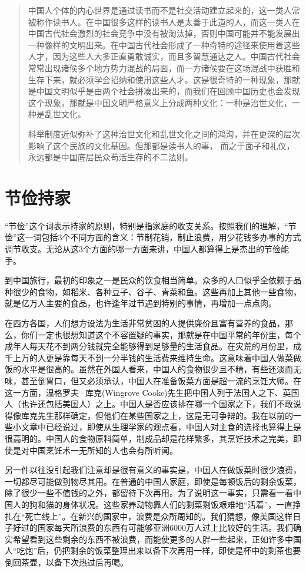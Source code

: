 \documentclass[12pt,oneside]{book}
\begin{document}
\begin{common-format}
\begin{quotation}
中国人个体的内心世界是通过读书而不是社交活动建立起来的，这一类人常被称作读书人。在中国很多这样的读书人是太善于此道的人，而这一类人在中国古代社会激烈的社会竞争中没有被淘汰掉，否则中国可能并不能发展出一种像样的文明出来。在中国古代社会形成了一种奇特的途径来使用着这些人才，因为这些人大多正直勇敢诚实，而且多智慧通达之人。中国古代社会常常出现诸侯多个地方势力混战的局面，而一方诸侯要在这场混战中获胜和生存下来，就必须学会招纳和使用这些人才。这是很奇特的一种现象，那就是中国文明似乎是由两个社会拼凑出来的，而我们在回顾中国历史也会发现这个现象，那就是中国文明严格意义上分成两种文化：一种是治世文化，一种是乱世文化。

科举制度近似弥补了这种治世文化和乱世文化之间的鸿沟，并在更深的层次影响了这个民族的文化基因。但那都是读书人的事， 而之于面子和礼仪，永远都是中国底层民众苟活生存的不二法则。
\end{quotation}


\chapter{节俭持家}
“节俭”这个词表示持家的原则，特别是指家庭的收支关系。按照我们的理解，“节俭”这一词包括3个不同方面的含义：节制花销，制止浪费，用少花钱多办事的方式调节收支。无论从这3个方面的哪一方面来讲，中国人都算得上是杰出的节俭能手。 

到中国旅行，最初的印象之一是民众的饮食相当简单。众多的人口似乎全依赖于品种很少的食物，如稻米、各种豆子、谷子、青菜和鱼。这些再加上其他一些食物，就是亿万人主要的食品，也许逢年过节遇到特别的事情，再增加一点点肉。 

在西方各国，人们想方设法为生活非常贫困的人提供廉价且富有营养的食品，那么，你们一定也很想知道这个不容置疑的事实，那就是在中国平常的年份里，每个成年人每天花不到两分钱就完全能够得到足够量的生活食品。在灾荒的月份里，成千上万的人更是靠每天不到一分半钱的生活费来维持生命。这意味着中国人做菜做饭的水平是很高的。虽然在外国人看来，中国人的食物很少且不精，有些还淡而无味，甚至倒胃口，但又必须承认，中国人在准备饭菜方面是超一流的烹饪大师。在这一方面，温格罗夫·库克(Wingrove Cooke)先生把中国人列于法国人之下、英国人（也许还包括美国人）之上。中国人是否应该排在哪一个国家之下，我们不敢说得像库克先生那样确定，但他们在某些国家之上，这是无可争辩的。我在以前的一些小文章中已经说过，即使从生理学家的观点看，中国人对主食的选择也算得上是很高明的。中国人的食物原料简单，制成品却是花样繁多，其烹饪技术之完美，即使是对中国烹饪术一无所知的人也会有所听闻。 

另一件以往没引起我们注意却是很有意义的事实是，中国人在做饭菜时很少浪费，一切都尽可能做到物尽其用。在普通的中国人家庭，即使是每顿饭后的剩余饭菜，除了很少一些不值钱的之外，都留待下次再用。为了说明这一事实，只需看一看中国人的狗和猫的身体状况。这些家养动物靠人们的剩菜剩饭艰难地“活着”，一直挣扎在“死亡线上”。在新兴的国家中，浪费是众所周知的。我们猜想，像美国这样日子好过的国家每天所浪费的东西有可能够亚洲6000万人过上比较好的生活。我们确实希望看到这些剩余的东西不被浪费，而能使更多的人胖一些起来，正如许多中国人“吃饱”后，仍把剩余的饭菜整理出来以备下次再用一样，即使是杯中的剩茶也要倒回茶壶，以备下次热过后再喝。 


\end{common-format}
\end{document}
